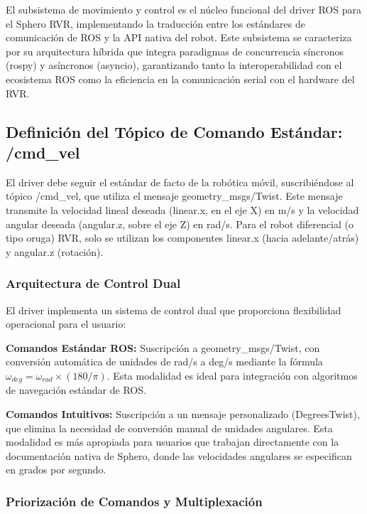 \documentclass[11pt]{article}
\newcommand{\code}[1]{\textcolor{codeblue}{\url{#1}}}
\numberwithin{figure}{section}
\numberwithin{table}{section}
\def\code#1{#1}%
\begin{document}
El subsistema de movimiento y control es el núcleo funcional del driver ROS para el Sphero RVR, implementando la traducción entre los estándares de comunicación de ROS y la API nativa del robot. Este subsistema se caracteriza por su arquitectura híbrida que integra paradigmas de concurrencia síncronos (rospy) y asíncronos (asyncio), garantizando tanto la interoperabilidad con el ecosistema ROS como la eficiencia en la comunicación serial con el hardware del RVR.


\subsection{Definición del Tópico de Comando Estándar: /cmd\_vel}

El driver debe seguir el estándar de facto de la robótica móvil, suscribiéndose al tópico \code{/cmd\_vel}, que utiliza el mensaje \code{geometry\_msgs/Twist}. Este mensaje transmite la velocidad lineal deseada (linear.x, en el eje X) en m/s y la velocidad angular deseada (angular.z, sobre el eje Z) en rad/s. Para el robot diferencial (o tipo oruga) RVR, solo se utilizan los componentes linear.x (hacia adelante/atrás) y angular.z (rotación).


\subsubsection{Arquitectura de Control Dual}

El driver implementa un sistema de control dual que proporciona flexibilidad operacional para el usuario:

\textbf{Comandos Estándar ROS:} Suscripción a \code{geometry\_msgs/Twist}, con conversión automática de unidades de rad/s a deg/s mediante la fórmula $\omega_{deg} = \omega_{rad} \times (180/\pi)$. Esta modalidad es ideal para integración con algoritmos de navegación estándar de ROS.

\textbf{Comandos Intuitivos:} Suscripción a un mensaje personalizado (DegreesTwist), que elimina la necesidad de conversión manual de unidades angulares. Esta modalidad es más apropiada para usuarios que trabajan directamente con la documentación nativa de Sphero, donde las velocidades angulares se especifican en grados por segundo.


\subsubsection{Priorización de Comandos y Multiplexación}
\end{document}
